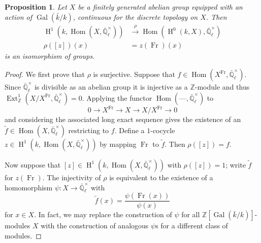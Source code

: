 \documentclass[11pt]{amsart}
\theoremstyle{plain}
\newtheorem{proposition}[theorem]{Proposition}
\theoremstyle{definition}
\theoremstyle{remark}
\newcommand{\ZZ}{{\mathbb{Z}}}
\newcommand{\EE}{\mathbb{\bar Q}_\ell}
\newcommand{\bFq}{\bar{k}}
\newcommand{\Fq}{k}
\DeclareMathOperator{\Gal}{Gal}
\newcommand{\Frob}{{\operatorname{Fr}}}
\DeclareMathOperator{\Hom}{Hom}
\DeclareMathOperator{\Ext}{Ext}
\DeclareMathOperator{\Hh}{H}
\begin{document}
%
\begin{proposition}\label{prop:X}
Let $X$ be a finitely generated abelian group equipped with an action of $\Gal(\bFq/\Fq)$, continuous for the discrete topology on $X$.  Then
\begin{align*}
\Hh^1(\Fq, \Hom(X, \EE^\times)) &\xrightarrow{\rho} \Hom(\Hh^0(\Fq, X), \EE^\times) \\
\rho([z])(x) &= z(\Frob)(x)
\end{align*}
is an isomorphism of groups.
\end{proposition}
\begin{proof}
We first prove that $\rho$ is surjective.  Suppose that $f \in \Hom(X^\Frob, \EE^\times).$  Since $\EE^\times$ is divisible as an abelian group it is injective as a $\ZZ$-module and thus $\Ext^1_{\ZZ}(X/X^\Frob, \EE^\times) = 0$.  Applying the functor $\Hom(\mbox{---}, \EE^\times)$ to
$$0 \rightarrow X^\Frob \rightarrow X \rightarrow X/X^\Frob \rightarrow 0$$
and considering the associated long exact sequence gives the existence of an $\tilde{f} \in \Hom(X, \EE^\times)$ restricting to $f$.  Define a $1$-cocycle $z \in \Hh^1(\Fq, \Hom(X,\EE^\times))$ by mapping $\Frob$ to $\tilde{f}$.  Then $\rho([z]) = f$.

Now suppose that $[z] \in \Hh^1(\Fq,\Hom(X,\EE^\times))$ with $\rho([z]) = 1$; write $\tilde{f}$ for $z(\Frob)$.  The injectivity of $\rho$ is equivalent to the existence of a homomorphism $\psi \colon X \rightarrow \EE^\times$ with 
$$\tilde{f}(x) = \frac{\psi(\Frob(x))}{\psi(x)}$$
for $x \in X$.  In fact, we may replace the construction of $\psi$ for all $\ZZ[\Gal(\bFq/\Fq)]$-modules $X$ with the construction of analogous $\psi$s for a different class of modules.


\end{proof}
\end{document}
